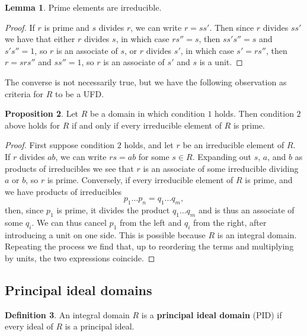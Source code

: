 \documentclass{article}
\theoremstyle{definition}\newtheorem{definition}{Definition}[subsection]
\theoremstyle{definition}\newtheorem{remark}[definition]{Remark}
\theoremstyle{definition}\newtheorem*{example}{Example}
\theoremstyle{definition}\newtheorem*{note}{Note}
\newtheorem{proposition}[definition]{Proposition}
\newtheorem{lemma}[definition]{Lemma}
\begin{document}
\begin{lemma}
Prime elements are irreducible.
\end{lemma}

\begin{proof}
If $ r $ is prime and $ s $ divides $ r $, we can write $ r = ss' $. Then since $ r $ divides $ ss' $ we have that either $ r $ divides $ s $, in which case $ rs'' = s $, then $ ss's'' = s $ and $ s's'' = 1 $, so $ r $ is an associate of $ s $, or $ r $ divides $ s' $, in which case $ s' = rs'' $, then $ r = srs'' $ and $ ss'' = 1 $, so $ r $ is an associate of $ s' $ and $ s $ is a unit.
\end{proof}

The converse is not necessarily true, but we have the following observation as criteria for $ R $ to be a UFD.

\begin{proposition}
Let $ R $ be a domain in which condition $ 1 $ holds. Then condition $ 2 $ above holds for $ R $ if and only if every irreducible element of $ R $ is prime.
\end{proposition}

\begin{proof}
First suppose condition $ 2 $ holds, and let $ r $ be an irreducible element of $ R $. If $ r $ divides $ ab $, we can write $ rs = ab $ for some $ s \in R $. Expanding out $ s $, $ a $, and $ b $ as products of irreducibles we see that $ r $ is an associate of some irreducible dividing $ a $ or $ b $, so $ r $ is prime. Conversely, if every irreducible element of $ R $ is prime, and we have products of irreducibles
$$ p_1 \dots p_n = q_1 \dots q_m, $$
then, since $ p_1 $ is prime, it divides the product $ q_1 \dots q_m $ and is thus an associate of some $ q_i $. We can thus cancel $ p_1 $ from the left and $ q_i $ from the right, after introducing a unit on one side. This is possible because $ R $ is an integral domain. Repeating the process we find that, up to reordering the terms and multiplying by units, the two expressions coincide.
\end{proof}

\subsection{Principal ideal domains}

\begin{definition}
An integral domain $ R $ is a \textbf{principal ideal domain} (PID) if every ideal of $ R $ is a principal ideal.
\end{definition}
\end{document}
